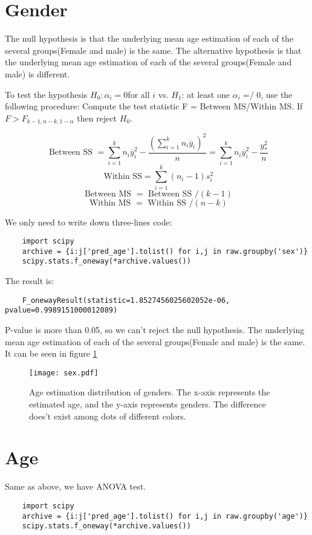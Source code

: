 \documentclass[fancy,11pt,twocol]{elegantbook}
\begin{document}
\section{Gender}

The null hypothesis is that the underlying mean age estimation of each of the several groups(Female and male) is the same.
The alternative hypothesis is that the underlying mean age estimation of each of the several groups(Female and male) is different.

To test the hypothesis $H_0 : α_i = 0 $for all $i$ vs. $H_1$: at least one $α_i ≠ 0$, use the following procedure:
Compute the test statistic F = Between MS/Within MS.
If $F > F_{k−1,n−k,1−α}$ then reject $H_0$. 




$$\text { Between SS }=\sum_{i=1}^{k} n_{i} \overline{y}_{i}^{2}-\frac{\left(\sum_{i=1}^{k} n_{i} \overline{y}_{i}\right)^{2}}{n}=\sum_{i=1}^{k} n_{i} \overline{y}_{i}^{2}-\frac{y_{*}^{2}}{n} $$
$$
\text { Within } \mathrm{SS}=\sum_{i=1}^{k}\left(n_{i}-1\right) s_{i}^{2}
$$
$$\text { Between MS } = \text { Between SS }/(k-1)$$
$$\text { Within MS } = \text { Within SS }/(n-k)$$

We only need to write down three-lines code:
\begin{lstlisting}
	import scipy
	archive = {i:j['pred_age'].tolist() for i,j in raw.groupby('sex')}
	scipy.stats.f_oneway(*archive.values())
\end{lstlisting}

The result is:
\begin{lstlisting}
	F_onewayResult(statistic=1.8527456025602052e-06, pvalue=0.9989151000012089)
\end{lstlisting}

P-value is more than 0.05, so we can't reject the null hypothesis. The underlying mean age estimation of each of the several groups(Female and male) is the same. It can be seen in figure \ref{sex}
\begin{figure}[htbp]
	\centering
	\texttt{[image: sex.pdf]}
	\caption{Age estimation distribution of genders. 
	The x-axis represents the estimated age, 
	and the y-axis represents genders. The difference does't exist among dots of different colors.\label{sex}}
\end{figure}


\section{Age}
Same as above, we have ANOVA test.
\begin{lstlisting}
	import scipy
	archive = {i:j['pred_age'].tolist() for i,j in raw.groupby('age')}
	scipy.stats.f_oneway(*archive.values())
\end{lstlisting}
\end{document}
